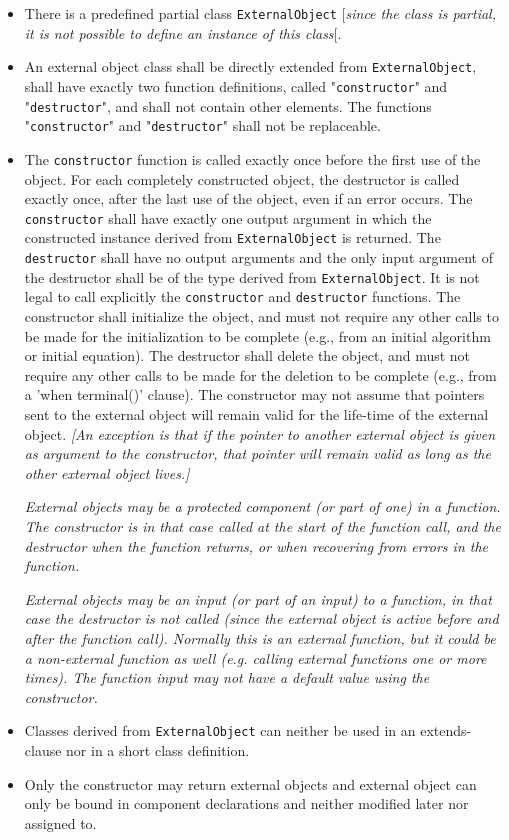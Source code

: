 \begin{itemize}
\item
  There is a predefined partial class \lstinline!ExternalObject! {[}\emph{since the class
  is partial, it is not possible to define an instance of this class}{[}.
\item
  An external object class shall be directly extended from
  \lstinline!ExternalObject!, shall have exactly two function definitions, called
  "\lstinline!constructor!" and "\lstinline!destructor!", and shall not contain other elements.
  The functions "\lstinline!constructor!" and "\lstinline!destructor!" shall not be replaceable.
\item
  The \lstinline!constructor! function is called exactly once before the first use
  of the object. For each completely constructed object, the destructor
  is called exactly once, after the last use of the object, even if an
  error occurs. The \lstinline!constructor! shall have exactly one output argument
  in which the constructed instance derived from \lstinline!ExternalObject! is
  returned. The \lstinline!destructor! shall have no output arguments and the only
  input argument of the destructor shall be of the type derived from
  \lstinline!ExternalObject!. It is not legal to call explicitly the \lstinline!constructor! and
  \lstinline!destructor! functions. The constructor shall initialize the object, and
  must not require any other calls to be made for the initialization to
  be complete (e.g., from an initial algorithm or initial equation). The
  destructor shall delete the object, and must not require any other
  calls to be made for the deletion to be complete (e.g., from a 'when
  terminal()' clause). The constructor may not assume that pointers sent
  to the external object will remain valid for the life-time of the
  external object. \emph{{[}An exception is that if the pointer to
  another external object is given as argument to the constructor, that
  pointer will remain valid as long as the other external object
  lives.{]}}

  \emph{External objects may be a protected component (or part of one)
  in a function. The constructor is in that case called at the start of
  the function call, and the destructor when the function returns, or
  when recovering from errors in the function.}

  \emph{External objects may be an input (or part of an input) to a
  function, in that case the destructor is not called (since the
  external object is active before and after the function call).
  Normally this is an external function, but it could be a non-external
  function as well (e.g. calling external functions one or more times).
  The function input may not have a default value using the
  constructor.}
\item
  Classes derived from \lstinline!ExternalObject! can neither be used in an
  extends-clause nor in a short class definition.
\item
  Only the constructor may return external objects and external object
  can only be bound in component declarations and neither modified later
  nor assigned to.


\end{itemize}
